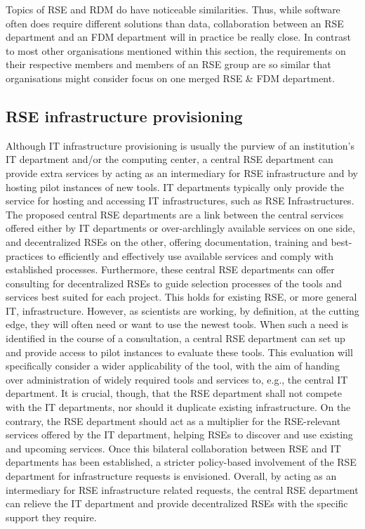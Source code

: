 \documentclass[a4paper]{article}
\begin{document}
Topics of RSE and RDM do have noticeable similarities.
Thus, while software often does require different solutions than data, collaboration between an RSE department and an FDM department will in practice be really close.
In contrast to most other organisations mentioned within this section,
the requirements on their respective members and members of an RSE group are so similar that organisations might consider focus on one merged RSE \& FDM department.

\subsection{RSE infrastructure provisioning}
\label{sec:infrastructure}

Although IT infrastructure provisioning is usually the purview of an institution's IT department and/or the computing center,
a central RSE department can provide extra services by acting as an intermediary for RSE infrastructure and by hosting pilot instances of new tools.
IT departments typically only provide the service for hosting and accessing IT infrastructures, such as RSE Infrastructures.
The proposed central RSE departments are a link between the central services offered either by IT departments or over-archlingly available services on one side,
and decentralized RSEs on the other, offering documentation, training and best-practices to efficiently and effectively use available services and comply with established processes.
Furthermore, these central RSE departments can offer consulting for decentralized RSEs to guide selection processes of the tools and services best suited for each project.
This holds for existing RSE, or more general IT, infrastructure.
However, as scientists are working, by definition, at the cutting edge, they will often need or want to use the newest tools.
When such a need is identified in the course of a consultation, a central RSE department can set up and provide access to pilot instances to evaluate these tools.
This evaluation will specifically consider a wider applicability of the tool, with the aim of handing over administration of widely required tools and services to, e.g., the central IT department.
It is crucial, though, that the RSE department shall not compete with the IT departments, nor should it duplicate existing infrastructure.
On the contrary, the RSE department should act as a multiplier for the RSE-relevant services offered by the IT department, helping RSEs to discover and use existing and upcoming services.
Once this bilateral collaboration between RSE and IT departments has been established, a stricter policy-based involvement of the RSE department for infrastructure requests is envisioned.
Overall, by acting as an intermediary for RSE infrastructure related requests, the central RSE department can relieve the IT department and provide decentralized RSEs with the specific support they require.
\end{document}
